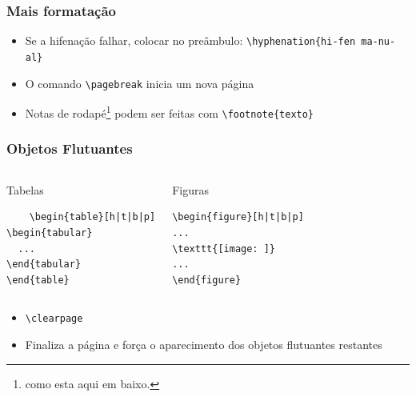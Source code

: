 \begin{frame}[fragile]
\frametitle{Mais formatação}

\begin{itemize}
  \item Se a hifenação falhar, colocar no preâmbulo: \verb|\hyphenation{hi-fen ma-nu-al}|
  \item O comando \verb|\pagebreak| inicia um nova página
  \item Notas de rodapé\footnote{como esta aqui em baixo.} podem ser feitas com
  \verb|\footnote{texto}|
\end{itemize}
 
\end{frame}

\begin{frame}[fragile]
\frametitle{Objetos Flutuantes}
\begin{columns}
	\small
\begin{block}{Tabelas}
\begin{verbatim}
	\begin{table}[h|t|b|p]
\begin{tabular}
  ...
\end{tabular}
\end{table}
\end{verbatim}
\end{block}

\begin{block}{Figuras}
\begin{verbatim}
\begin{figure}[h|t|b|p] 
... 
\texttt{[image: ]}
... 
\end{figure}
\end{verbatim}
\end{block}
\end{columns}

\begin{itemize}
  \item  \verb|\clearpage|
  \item[] Finaliza a página e força o aparecimento dos objetos flutuantes
  restantes
\end{itemize}
 
\end{frame}


